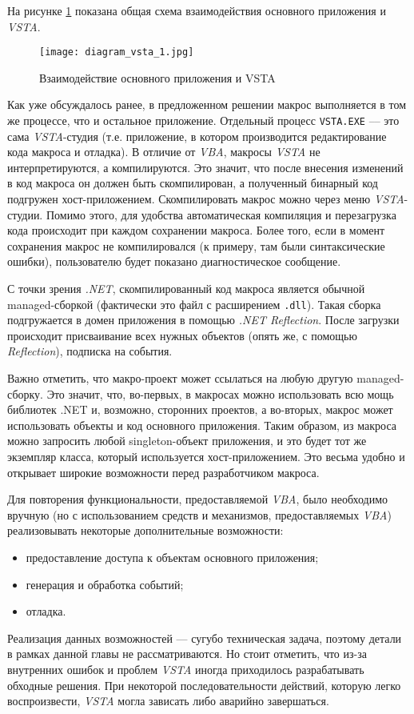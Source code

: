 На рисунке \ref{diagram_vsta_1} показана общая схема взаимодействия основного приложения и {\it VSTA}. 

\begin{figure}[!h]
    \centering
    \texttt{[image: diagram\_vsta\_1.jpg]}
    \caption{Взаимодействие основного приложения и VSTA}
    \label{diagram_vsta_1}
\end{figure} 

Как уже обсуждалось ранее, в предложенном решении макрос выполняется в том же процессе, что и остальное приложение. Отдельный процесс {\tt VSTA.EXE} –-- это сама {\it VSTA}-студия (т.е. приложение, в котором производится редактирование кода макроса и отладка). 
В отличие от {\it VBA}, макросы {\it VSTA} не интерпретируются, а компилируются. Это значит, что после внесения изменений в код макроса он должен быть скомпилирован, а полученный бинарный код подгружен хост-приложением. Скомпилировать макрос можно через меню {\it VSTA}-студии. Помимо этого, для удобства автоматическая компиляция и перезагрузка кода происходит при каждом сохранении макроса. Более того, если в момент сохранения макрос не компилировался (к примеру, там были синтаксические ошибки), пользователю будет показано диагностическое сообщение.

С точки зрения {\it .NET}, скомпилированный код макроса является обычной managed-сборкой (фактически это файл с расширением {\tt .dll}). Такая сборка подгружается в домен приложения в помощью {\it .NET Reflection}. После загрузки происходит присваивание всех нужных объектов (опять же, с помощью {\it Reflection}), подписка на события. 

Важно отметить, что макро-проект может ссылаться на любую другую managed-сборку. Это значит, что, во-первых, в макросах можно использовать всю мощь библиотек .NET и, возможно, сторонних проектов, а во-вторых, макрос может использовать объекты и код основного приложения. Таким образом, из макроса можно запросить любой singleton-объект приложения, и это будет тот же экземпляр класса, который используется хост-приложением. Это весьма удобно и открывает широкие возможности перед разработчиком макроса.

Для повторения функциональности, предоставляемой {\it VBA}, было необходимо вручную (но с использованием средств и механизмов, предоставляемых {\it VBA}) реализовывать некоторые дополнительные возможности:
\begin{itemize}
\item предоставление доступа к объектам основного приложения;
\item генерация и обработка событий;
\item отладка.
\end{itemize}
Реализация данных возможностей --- сугубо техническая задача, поэтому детали в рамках данной главы не рассматриваются. Но стоит отметить, что из-за внутренних ошибок и проблем {\it VSTA} иногда приходилось разрабатывать обходные решения. При некоторой последовательности действий, которую легко воспроизвести, {\it VSTA} могла зависать либо аварийно завершаться.

